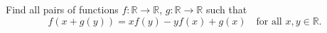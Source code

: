 Find all pairs of functions $f : \mathbb{R} \to \mathbb{R}$, $g : \mathbb{R} \to \mathbb{R}$ such that
\[ f(x + g(y)) = xf(y) - yf(x) + g(x) \quad \text{for all } x, y \in \mathbb{R}. \]
